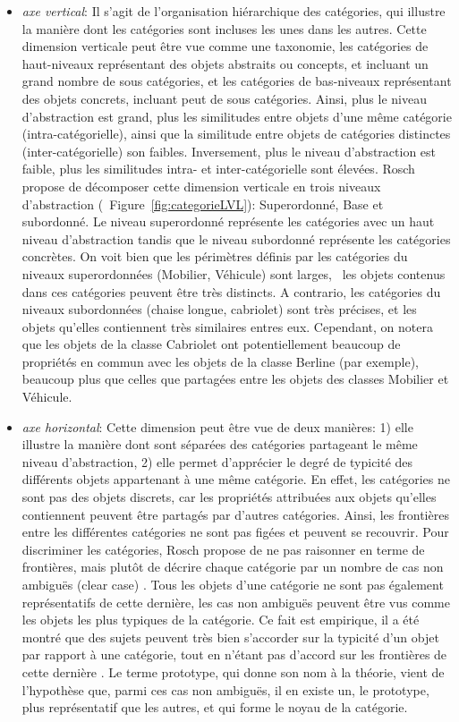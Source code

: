 \begin{itemize}
\item \textit{axe vertical}: Il s'agit de l'organisation hiérarchique des catégories, qui illustre la manière dont les catégories sont incluses les unes dans les autres. Cette dimension verticale peut être vue comme une taxonomie, les catégories de haut-niveaux représentant des objets abstraits ou concepts, et incluant un grand nombre de sous catégories, et les catégories de bas-niveaux représentant des objets concrets, incluant peut de sous catégories. Ainsi, plus le niveau d'abstraction est grand, plus les similitudes entre objets d'une même catégorie (intra-catégorielle), ainsi que la similitude entre objets de catégories distinctes (inter-catégorielle) son faibles. Inversement, plus le niveau d'abstraction est faible, plus les similitudes intra- et inter-catégorielle sont élevées. Rosch propose de décomposer cette dimension verticale en trois niveaux d'abstraction (\Cf~Figure~\ref{fig:categorieLVL}): Superordonné, Base et subordonné. Le niveau superordonné représente les catégories avec un haut niveau d'abstraction tandis que le niveau subordonné représente les catégories concrètes. On voit bien que les périmètres définis par les catégories du niveaux superordonnées (Mobilier, Véhicule) sont larges, \ie~les objets contenus dans ces catégories peuvent être très distincts. A contrario, les catégories du niveaux subordonnées (chaise longue, cabriolet) sont très précises, et les objets qu'elles contiennent très similaires entres eux. Cependant, on notera que les objets de la classe Cabriolet ont potentiellement beaucoup de propriétés en commun avec les objets de la classe Berline (par exemple), beaucoup plus que celles que partagées entre les objets des classes Mobilier et Véhicule. 
\item \textit{axe horizontal}: Cette dimension peut être vue de deux manières: 1) elle illustre la manière dont sont séparées des catégories partageant le même niveau d'abstraction, 2) elle permet d'apprécier le degré de typicité des différents objets appartenant à une même catégorie. En effet, les catégories ne sont pas des objets discrets, car les propriétés attribuées aux objets qu'elles contiennent peuvent être partagés par d'autres catégories. Ainsi, les frontières entre les différentes catégories ne sont pas figées et peuvent se recouvrir. Pour discriminer les catégories, Rosch propose de ne pas raisonner en terme de frontières, mais plutôt de décrire chaque catégorie par un nombre de cas non ambiguës (clear case) \citep[p. 36]{rosch1978cognition}. Tous les objets d'une catégorie ne sont pas également représentatifs de cette dernière, les cas non ambiguës peuvent être vus comme les objets les plus typiques de la catégorie. Ce fait est empirique, il a été montré que des sujets peuvent très bien s'accorder sur la typicité d'un objet par rapport à une catégorie, tout en n'étant pas d'accord sur les frontières de cette dernière \citep{rosch1974human,rosch1975cognitive}. Le terme prototype, qui donne son nom à la théorie, vient de l'hypothèse que, parmi ces cas non ambiguës, il en existe un, le prototype, plus représentatif que les autres, et qui forme le noyau de la catégorie.
\end{itemize}

